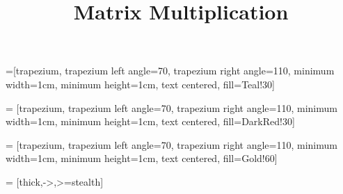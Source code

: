 \title{Matrix Multiplication}
\subtitle{\SubTitleName}
\institute[]{\Course}
\author{\Instructor}
\maketitle

 =[trapezium, trapezium left angle=70, trapezium right angle=110, minimum width=1cm, minimum height=1cm, text centered, fill=Teal!30]

 = [trapezium, trapezium left angle=70, trapezium right angle=110, minimum width=1cm, minimum height=1cm, text centered, fill=DarkRed!30]

 = [trapezium, trapezium left angle=70, trapezium right angle=110, minimum width=1cm, minimum height=1cm, text centered, fill=Gold!60]

 = [thick,->,>=stealth]




